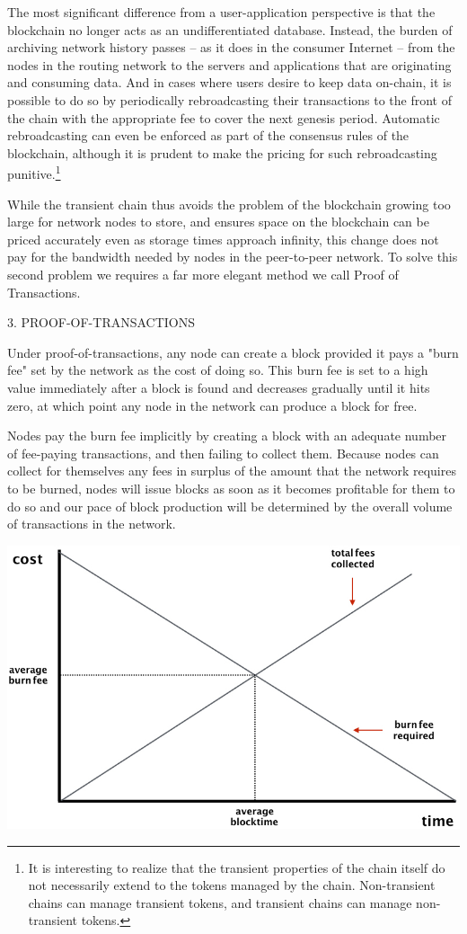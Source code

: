 \documentclass[11.5pt, oneside]{article}   	%
\begin{document}
\begin{multicols}{2}
The most significant difference from a user-application perspective is that the blockchain no longer acts as an undifferentiated database. Instead, the burden of archiving network history passes -- as it does in the consumer Internet -- from the nodes in the routing network to the servers and applications that are originating and consuming data. And in cases where users desire to keep data on-chain, it is possible to do so by periodically rebroadcasting their transactions to the front of the chain with the appropriate fee to cover the next genesis period. Automatic rebroadcasting can even be enforced as part of the consensus rules of the blockchain, although it is prudent to make the pricing for such rebroadcasting punitive.\footnote[1]{It is interesting to realize that the transient properties of the chain itself do not necessarily extend to the tokens managed by the chain. Non-transient chains can manage transient tokens, and transient chains can manage non-transient tokens.} 

While the transient chain thus avoids the problem of the blockchain growing too large for network nodes to store, and ensures space on the blockchain can be priced accurately even as storage times approach infinity, this change does not pay for the bandwidth needed by nodes in the peer-to-peer network. To solve this second problem we requires a far more elegant method we call Proof of Transactions.

3. PROOF-OF-TRANSACTIONS

Under proof-of-transactions, any node can create a block provided it pays a "burn fee" set by the network as the cost of doing so. This burn fee is set to a high value immediately after a block is found and decreases gradually until it hits zero, at which point any node in the network can produce a block for free.

Nodes pay the burn fee implicitly by creating a block with an adequate number of fee-paying transactions, and then failing to collect them. Because nodes can collect for themselves any fees in surplus of the amount that the network requires to be burned, nodes will issue blocks as soon as it becomes profitable for them to do so and our pace of block production will be determined by the overall volume of transactions in the network.

\includegraphics[width=.45\textwidth]{saito2.jpeg}


\end{multicols}
\end{document}
